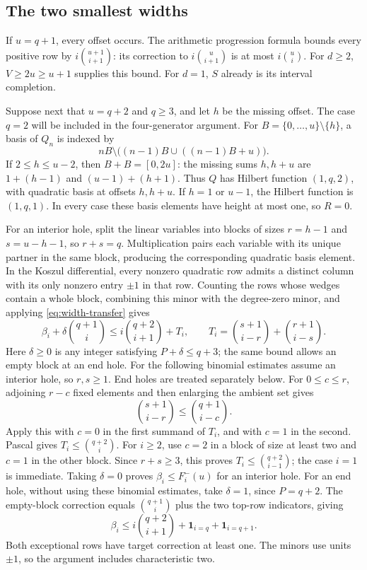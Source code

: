 \subsection{The two smallest widths}

If $u=q+1$, every offset occurs.  The arithmetic progression formula
\cite{APFormula,APCone} bounds every positive row by
$i\binom{u+1}{i+1}$: its correction to $i\binom u{i+1}$ is at most
$i\binom ui$.  For $d\ge2$, $V\ge2u\ge u+1$ supplies this bound.
For $d=1$, $S$ already is its interval completion.

Suppose next that $u=q+2$ and $q\ge3$, and let $h$ be the missing
offset.  The case $q=2$ will be included in the four-generator argument.
For
$B=\{0,\ldots,u\}\setminus\{h\}$, a basis of $Q_n$ is indexed by
\[
 nB\setminus\bigl((n-1)B\cup((n-1)B+u)\bigr).
\]
If $2\le h\le u-2$, then $B+B=[0,2u]$: the missing sums $h,h+u$
are $1+(h-1)$ and $(u-1)+(h+1)$.  Thus $Q$ has Hilbert function
$(1,q,2)$, with quadratic basis at offsets $h,h+u$.  If $h=1$ or
$u-1$, the Hilbert function is $(1,q,1)$.  In every case these basis
elements have height at most one, so $R=0$.

For an interior hole, split the linear variables into blocks of sizes
$r=h-1$ and $s=u-h-1$, so $r+s=q$.  Multiplication pairs each variable
with its unique partner in the same block, producing the corresponding
quadratic basis element.  In the Koszul differential, every nonzero
quadratic row admits a distinct column with its only nonzero entry
$\pm1$ in that row.  Counting the rows whose wedges contain a whole
block, combining this minor with the degree-zero minor, and applying
\eqref{eq:width-transfer} gives
\[
 \beta_i+\delta\binom{q+1}i\le i\binom{q+2}{i+1}+T_i,
 \qquad
 T_i=\binom{s+1}{i-r}+\binom{r+1}{i-s}.
\]
Here $\delta\ge0$ is any integer satisfying $P+\delta\le q+3$;
the same bound allows an empty block at an end hole.
For the following binomial estimates assume an interior hole, so
$r,s\ge1$. End holes are treated separately below.
For $0\le c\le r$, adjoining $r-c$ fixed elements and then enlarging
the ambient set gives
\[
 \binom{s+1}{i-r}\le\binom{q+1}{i-c}.
\]
Apply this with $c=0$ in the first summand of $T_i$, and with $c=1$
in the second.  Pascal gives $T_i\le\binom{q+2}i$.
For $i\ge2$, use $c=2$ in a block of size at least two and $c=1$
in the other block.  Since $r+s\ge3$, this proves
$T_i\le\binom{q+2}{i-1}$; the case $i=1$ is immediate.
Taking $\delta=0$ proves $\beta_i\le F_i^-(u)$ for an interior hole.
For an end hole, without using these binomial estimates, take
$\delta=1$, since $P=q+2$.
The empty-block correction equals $\binom{q+1}i$
plus the two top-row indicators, giving
\[
 \beta_i\le i\binom{q+2}{i+1}
                   +\mathbf1_{i=q}+\mathbf1_{i=q+1}.
\]
Both exceptional rows have target correction at least one.  The minors
use units $\pm1$, so the argument includes characteristic two.

